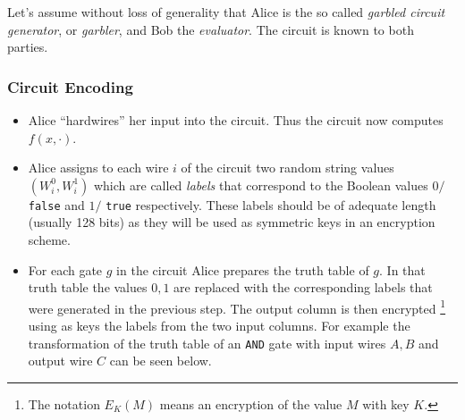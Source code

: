Let's assume without loss of generality that Alice is the so called \textit{garbled circuit generator}, or \textit{garbler}, and Bob the \textit{evaluator}. The circuit is known to both parties.

\subsubsection{Circuit Encoding}\label{sss:circuit-encoding}

\begin{itemize}
  \item Alice ``hardwires'' her input into the circuit. Thus the circuit now computes $f(x, \cdot)$.
  \item Alice assigns to each wire $i$ of the circuit two random string values $(W_i^0, W_i^1)$ which are called \textit{labels} that correspond to the Boolean values $0 /$ \texttt{false} and $1 /$ \texttt{true} respectively. These labels should be of adequate length (usually 128 bits) as they will be used as symmetric keys in an encryption scheme.
  \item For each gate $g$ in the circuit Alice prepares the truth table of $g$. In that truth table the values $0,1$ are replaced with the corresponding labels that were generated in the previous step. The output column is then encrypted \footnote{The notation $E_{K}(M)$ means an encryption of the value $M$ with key $K$.} using as keys the labels from the two input columns.
  For example the transformation of the truth table of an \texttt{AND} gate with input wires $A,B$ and output wire $C$ can be seen below.


\end{itemize}
